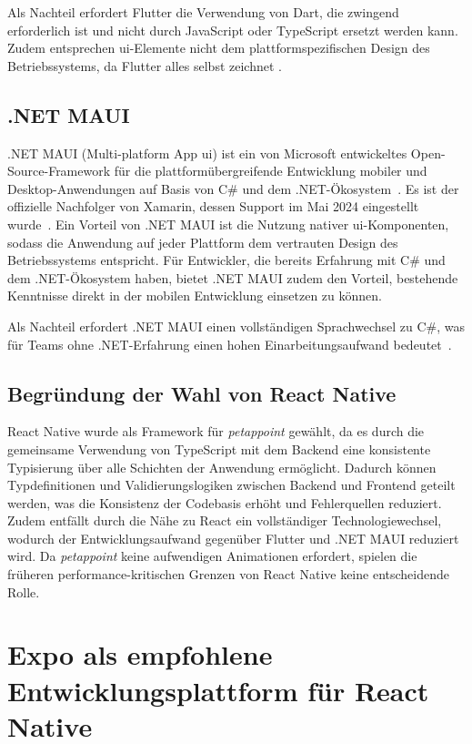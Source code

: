 Als Nachteil erfordert Flutter die Verwendung von Dart, die zwingend erforderlich ist und nicht durch JavaScript oder TypeScript ersetzt werden kann. Zudem entsprechen \gls{ui}-Elemente nicht dem plattformspezifischen Design des Betriebssystems, da Flutter alles selbst zeichnet \cite{flutter-docs}.

\subsection{.NET MAUI}
.NET MAUI (Multi-platform App \gls{ui}) ist ein von Microsoft entwickeltes Open-Source-Framework für die plattformübergreifende Entwicklung mobiler und Desktop-Anwendungen auf Basis von C\# und dem 
.NET-Ökosystem~\cite{maui-docs}. Es ist der offizielle Nachfolger von Xamarin, dessen Support im Mai 2024 eingestellt wurde~\cite{maui-docs}. Ein Vorteil von .NET MAUI ist die Nutzung nativer \gls{ui}-Komponenten, sodass die Anwendung auf jeder Plattform dem vertrauten Design des 
Betriebssystems entspricht. Für Entwickler, die bereits Erfahrung mit C\# und dem .NET-Ökosystem haben, bietet .NET MAUI zudem den Vorteil, bestehende Kenntnisse direkt in der mobilen Entwicklung einsetzen zu können. 

Als Nachteil erfordert .NET MAUI einen vollständigen Sprachwechsel zu C\#, was für Teams ohne .NET-Erfahrung einen 
hohen Einarbeitungsaufwand bedeutet~\cite{maui-docs}.

\subsection{Begründung der Wahl von React Native}

React Native wurde als Framework für \textit{petappoint} gewählt, da es durch die gemeinsame Verwendung von TypeScript mit dem Backend eine konsistente Typisierung über alle Schichten der Anwendung ermöglicht. Dadurch können Typdefinitionen und 
Validierungslogiken zwischen Backend und Frontend geteilt werden, was die Konsistenz der Codebasis erhöht und Fehlerquellen reduziert. Zudem entfällt durch die Nähe zu React ein vollständiger Technologiewechsel, wodurch der Entwicklungsaufwand gegenüber Flutter und .NET MAUI reduziert wird. Da \textit{petappoint} keine aufwendigen Animationen erfordert, spielen die früheren performance-kritischen Grenzen von React Native keine entscheidende Rolle.

\section{Expo als empfohlene Entwicklungsplattform für React Native}

